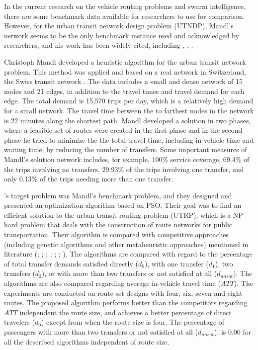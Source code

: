 
In the current research on the vehicle routing problems and swarm intelligence, there are some benchmark data available for researchers to use for comparison. However, for the urban transit network design problem (UTNDP), Mandl's network seems to be the only benchmark instance used and acknowledged by researchers, and his work has been widely cited, including \citep{fan09}, \citep{kechagiopoulos14}, \citep{nikolic14}. %
\par
Christoph Mandl \citep{mandl79} developed a heuristic algorithm for the urban transit network problem. This method was applied and based on a real network in Switzerland, the Swiss transit network \citep{mandl80}. The data includes a small and dense network of 15 nodes and 21 edges, in addition to the travel times and travel demand for each edge. The total demand is 15,570 trips per day, which is a relatively high demand for a small network. The travel time between the to farthest nodes in the network is 22 minutes along the shortest path. Mandl developed a solution in two phases, where a feasible set of routes were created in the first phase and in the second phase he tried to minimize the the total travel time, including in-vehicle time and waiting time, by reducing the number of transfers. Some important measures of Mandl's solution network includes, for example, 100\% service coverage, 69.4\% of the trips involving no transfers, 29.93\% of the trips involving one transfer, and only 0.13\% of the trips needing more than one transfer. %
\par
\citet{kechagiopoulos14}'s target problem was Mandl's benchmark problem, and they designed and presented an optimization algorithm based on PSO. Their goal was to find an efficient solution to the urban transit routing problem (UTRP), which is a NP-hard problem that deals with the construction of route networks for public transportation. Their algorithm is compared with competitive approaches (including genetic algorithms and other metaheuristic approaches) mentioned in literature (\citet{baaj91}; \citet{chakroborty02}; \citet{kidwai98}; \citet{fan10}; \citet{fan09-2}; \citet{zhang10}; \citet{chew12}). The algorithms are compared with regard to the percentage of total transfer demands satisfied directly ($d_0$), with one transfer ($d_1$), two transfers ($d_2$), or with more than two transfers or not satisfied at all ($d_{unsat}$). The algorithms are also compared regarding average in-vehicle travel time ($ATT$). The experiments are conducted on route set designs with four, six, seven and eight routes. The proposed algorithm performs better than the competitors regarding $ATT$ independent the route size, and achieves a better percentage of direct travelers ($d_0$) except from when the route size is four. The percentage of passengers with more than two transfers or not satisfied at all ($d_{unsat}$), is $0.00$ for all the described algorithms independent of route size.\par
